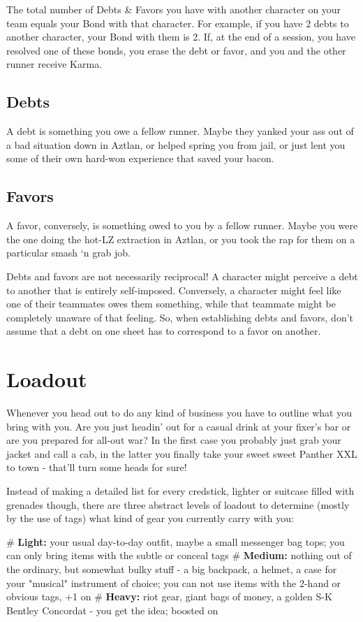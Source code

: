 The total number of Debts \& Favors you have with another character on your team equals your Bond with that character. For example, if you have 2 debts to another character, your Bond with them is 2. If, at the end of a session, you have resolved one of these bonds, you erase the debt or favor, and you and the other runner receive Karma.

\subsection{Debts}
A debt is something you owe a fellow runner. Maybe they yanked your ass out of a bad situation down in Aztlan, or helped spring you from jail, or just lent you some of their own hard-won experience that saved your bacon.

\subsection{Favors}
A favor, conversely, is something owed to you by a fellow runner. Maybe you were the one doing the hot-LZ extraction in Aztlan, or you took the rap for them on a particular smash ‘n grab job.

Debts and favors are not necessarily reciprocal! A character might perceive a debt to another that is entirely self-imposed. Conversely, a character might feel like one of their teammates owes them something, while that teammate might be completely unaware of that feeling. So, when establishing debts and favors, don’t assume that a debt on one sheet has to correspond to a favor on another.



\section{Loadout}

Whenever you head out to do any kind of business you have to outline what you bring with you. Are you just headin' out for a casual drink at your fixer's bar or are you prepared for all-out war? In the first case you probably just grab your jacket and call a cab, in the latter you finally take your sweet sweet Panther XXL to town - that'll turn some heads for sure!

Instead of making a detailed list for every credstick, lighter or suitcase filled with grenades though, there are three abstract levels of loadout to determine (mostly by the use of \refname{tags}) what kind of gear you currently carry with you:

\begin{easylist}
    # \textbf{Light:} your usual day-to-day outfit, maybe a small messenger bag tops; you can only bring items with the \textsf{subtle} or \textsf{conceal} tags
    # \textbf{Medium:} nothing out of the ordinary, but somewhat bulky stuff - a big backpack, a helmet, a case for your "musical" instrument of choice; you can not use items with the \textsf{2-hand} or \textsf{obvious} tags, +1 on 
    # \textbf{Heavy:} riot gear, giant bags of money, a golden S-K Bentley Concordat - you get the idea; boosted on 
\end{easylist}
